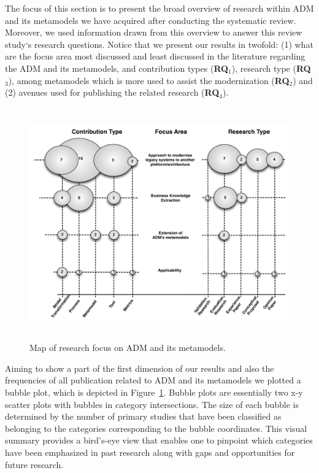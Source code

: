 

The focus of this section is to present the broad overview of research within ADM and its metamodels we have acquired after conducting the systematic review. Moreover, we used information drawn from this overview to answer this review study`s research questions. Notice that we present our results in twofold: (1) what are the focus area most discussed and least discussed in the literature regarding the ADM and its metamodels, and contribution types (\textbf{RQ$_1$}), research type (\textbf{RQ$_3$}), among metamodels which is more used to assist the modernization (\textbf{RQ$_2$}) and (2) avenues used for publishing the related research (\textbf{RQ$_4$}).

\begin{figure}[t]
\centering
  \includegraphics[width=18cm, height=10cm]{figuras/MapaNOVO3}
\caption{Map of research focus on ADM and its metamodels.}
\label{map}
\end{figure} 




Aiming to show a part of the first dimension of our results and also the frequencies of all publication related to ADM and its metamodels we plotted a bubble plot, which is depicted in Figure~\ref{map}. Bubble plots are essentially two x-y scatter plots with bubbles in category intersections. The size of each bubble is determined by the number of primary studies that have been classified as belonging to the categories corresponding to the bubble coordinates. This visual summary provides a bird's-eye view that enables one to pinpoint which categories have been emphasized in past research along with gaps and opportunities for future research.

